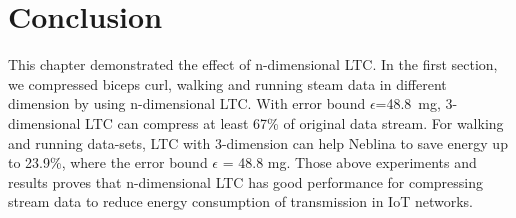 \section{Conclusion}
This chapter demonstrated the effect of n-dimensional LTC. In the first section,
we compressed biceps curl, walking and running steam data in different dimension
by using n-dimensional LTC. With error bound $\epsilon$=48.8\ mg, 3-dimensional
LTC can compress at least 67\% of original data stream. For walking and running
data-sets, LTC with 3-dimension can help Neblina to save energy up to 23.9\%,
where the error bound $\epsilon$ = 48.8 mg. Those above experiments and results
proves that n-dimensional LTC has good performance for compressing stream data
to reduce energy consumption of transmission in IoT networks.
